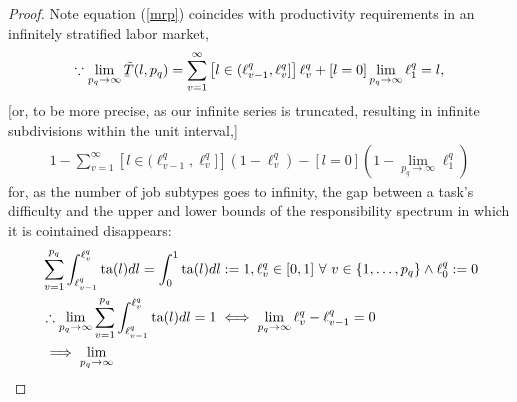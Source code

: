 \documentclass[hidelinks, nonatbib]{elsarticle}
\begin{document}
\begin{lemma}
\begin{proof}
        Note equation (\ref{mrp}) coincides with productivity requirements in an infinitely stratified labor market,
        \begin{gather}
            \because
            \lim_{p_q \rightarrow \infty}{
                \underaccent{\bar}{\tilde{T}}(l, p_q)
            }
            =
            \sum_{v=1}^{\infty}\left[
                l \in (
                    \ell_{v-1}^{q}
                    ,\ell_{v}^{q}
                ]
            \right]
            \ell_{v}^{q}
            +
            [l = 0]
            \lim_{p_q \rightarrow \infty}{
                \ell_{1}^{q}
            }
            =
            l
            ,
        \end{gather}
        [or, to be more precise, as our infinite series is truncated, resulting in infinite subdivisions within the unit interval,]
        \begin{gather}
            1
            -
            \sum_{v=1}^{\infty}\left[
                l \in (
                    \ell_{v-1}^{q}
                    ,\ell_{v}^{q}
                ]
            \right]
            (1 - \ell_{v}^{q})
            -
            [l = 0]\left(
                1 - 
                \lim_{p_q \rightarrow \infty}{
                    \ell_{1}^{q}
                }
            \right)
        \end{gather}
        for, as the number of job subtypes goes to infinity, the gap between a task's difficulty and the upper and lower bounds of the responsibility spectrum in which it is cointained disappears:
        \begin{align}
            &
            \sum_{v=1}^{p_q}
            \int_{\ell_{v-1}^{q}}^{\ell_{v}^{q}}
            \ta(l)dl
            =
            \int_{0}^{1}
            \ta(l)dl
            :=
            1,
            \ell_{v}^{q} \in [0,1]
            \
            \forall
            \
            v \in \{1, \dots, p_q\}
            \land
            \ell_{0}^{q}
            := 0
            \\
            &
            \therefore
            \lim_{p_q \rightarrow \infty}{
                \sum_{v=1}^{p_q}
                \int_{\ell_{v-1}^{q}}^{\ell_{v}^{q}}
                \ta(l)dl
            } 
            =
            1
            \iff
            \lim_{p_q \rightarrow \infty}{
                \ell_{v}^{q} - \ell_{v-1}^{q}
            }
            =
            0
            \\
            &
            \implies
            \lim_{p_q \rightarrow \infty}

\end{align}
\end{proof}
\end{lemma}
\end{document}
